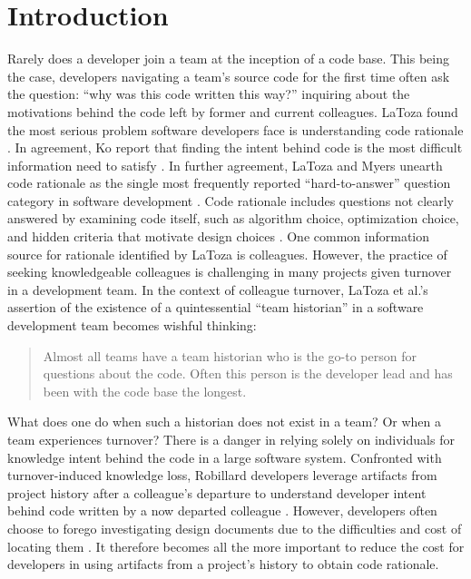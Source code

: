
\chapter{Introduction}
\label{ch:Introduction}


Rarely does a developer join a team at the inception of a code base. 
This being the case, developers navigating a team's source code for the first time often ask the question: 
``why was this code written this way?'' inquiring about the motivations behind the code left by former and current colleagues.
LaToza \etal found the most serious problem software developers face is understanding code rationale \cite{latoza_maintaining_2006}.
In agreement, Ko \etal report that finding the intent behind code is the most difficult information need to satisfy \cite{ko_information_2007}. 
In further agreement, LaToza and Myers unearth code rationale as the single most frequently reported “hard-to-answer” question category in software development \cite{latoza_hard-answer_2010}. 
Code rationale includes questions not clearly answered by examining code itself, such as algorithm choice, optimization choice, and hidden criteria that motivate design choices \cite{latoza_hard-answer_2010}. 
One common information source for rationale identified by LaToza \etal is colleagues. 
However, the practice of seeking knowledgeable colleagues is challenging in many projects given turnover in a development team. 
In the context of colleague turnover, LaToza et al.'s assertion of the existence of a quintessential ``team historian'' in a software development team \cite{latoza_maintaining_2006} becomes wishful thinking:

\begin{quote}
Almost all teams have a team historian who is the go-to person for questions about the
code. Often this person is the developer lead and has been with the code base the longest.
\end{quote}

What does one do when such a historian does not exist in a team? Or when a team experiences turnover?
There is a danger in relying solely on individuals for knowledge  intent behind the code in a large software system.
Confronted with turnover-induced knowledge loss, Robillard  developers leverage artifacts from  
project history after a colleague’s departure to understand developer intent behind code written by a now departed colleague \cite{robillard_turnover-induced_2021}. 
However, developers often choose to forego investigating design documents due to the difficulties and cost of locating them \cite{latoza_maintaining_2006}.
It therefore becomes all the more important to reduce the cost for developers in using artifacts from a project's history to obtain code rationale. 

